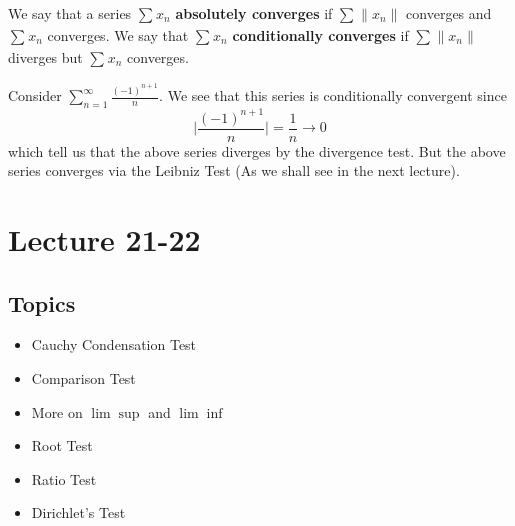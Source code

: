 \documentclass[a4paper]{article}
\begin{document}
\begin{definition}
    We say that a series \( \sum_{  }^{  }{x}_{n} \) \textbf{absolutely converges} if \( \sum_{  }^{  } \|{x}_{n}\| \) converges and \( \sum_{  }^{  } {x}_{n} \) converges. We say that \( \sum_{  }^{  }{x}_{n} \) \textbf{conditionally converges} if \( \sum_{  }^{  } \|{x}_{n}\|  \) diverges but \( \sum_{  }^{  } {x}_{n} \) converges. 
\end{definition}

\begin{eg}
    Consider \( \sum_{ n=1  }^{ \infty  } \frac{ (-1)^{n+1} }{ n }  \). We see that this series is conditionally convergent since  
    \[  \Big| \frac{ (-1)^{n+1} }{ n }  \Big|  = \frac{ 1 }{ n } \to 0 \]
    which tell us that the above series diverges by the divergence test. But the above series converges via the Leibniz Test (As we shall see in the next lecture).
\end{eg}

\section{Lecture 21-22}

\subsection{Topics}

\begin{itemize}
    \item Cauchy Condensation Test
    \item Comparison Test
    \item More on \( \lim \sup   \) and \( \lim \inf  \)
    \item Root Test
    \item Ratio Test
    \item Dirichlet's Test
\end{itemize}
\end{document}
